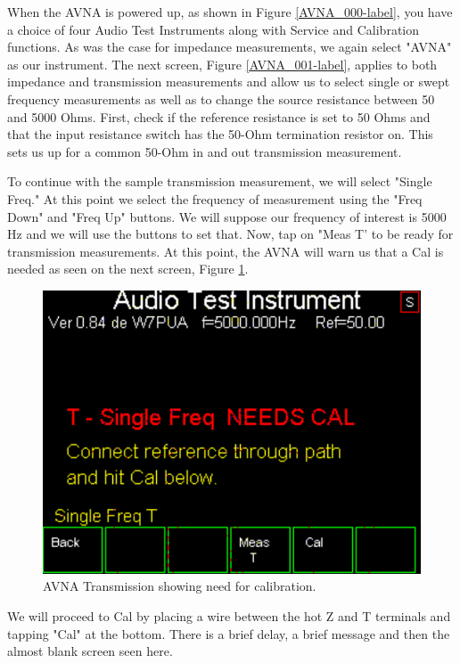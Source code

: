 When the AVNA is powered up, as shown in  Figure \ref{AVNA_000-label},  you have a choice of four Audio Test Instruments along with Service and Calibration functions.  As was the case for impedance measurements, we again select "AVNA" as our instrument.  The next screen, Figure  \ref{AVNA_001-label}, applies to both impedance and transmission measurements and allow us to select single or swept frequency measurements as well as to change the source resistance between 50 and 5000 Ohms.  First, check if the reference resistance is set to 50 Ohms and that the input resistance switch has the 50-Ohm termination resistor on.  This sets us up for a common 50-Ohm in and out transmission measurement.

To continue with the sample transmission measurement, we will select "Single Freq."  At this point we select the frequency of measurement using the "Freq Down" and "Freq Up"  buttons.  We will suppose our frequency of interest is 5000 Hz and we will use the buttons to set that.  Now, tap on "Meas T' to be ready for transmission measurements.   At this point, the AVNA will warn us that a Cal is needed as seen on the next screen, Figure  \ref{AVNA_043-label}.
\begin{figure}[H]
\begin{center}
\includegraphics[scale=0.75]{./images/AVNA_043.pdf}
\caption{AVNA Transmission showing need for calibration.}
\label{AVNA_043-label}
\end{center}
\end{figure}
%
 We will proceed to Cal by placing a wire between the hot Z and T terminals and tapping "Cal" at the bottom.   There is a brief delay, a brief message and then the almost blank screen seen here.
